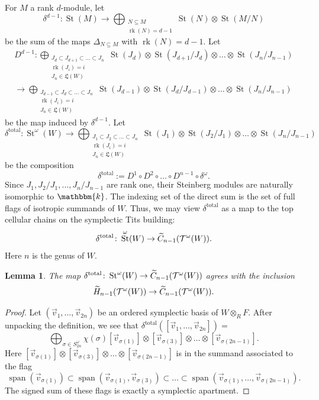 \documentclass[11pt,letterpaper]{amsart}
\newcommand{\bk}{\mathbbm{k}}
\DeclareMathOperator{\Span}{span}
\numberwithin{theoremcounter}{section}
\newtheorem{lemma}[lemmaauto]{Lemma}
\theoremstyle{definition}
\theoremstyle{remark}
\DeclareMathOperator{\rk}{rk}
\DeclareMathOperator{\St}{St}
\begin{document}
For $M$ a rank $d$-module, let $$\delta^{d-1} \colon \St(M) \longrightarrow \bigoplus_{\substack{N \subseteq M\\\rk(N)=d-1}} \St(N) \otimes \St(M/N) $$ be the sum of the maps $\Delta_{N \subseteq M}$ with $\rk(N)=d-1$. Let
\begin{multline*}D^{d-1} \colon \bigoplus_{\substack{J_d \subset J_{d+1} \subset \dots \subset J_n\\\rk(J_i) =i\\J_n \in \mathfrak L(W)}} \St(J_d) \otimes \St(J_{d+1}/J_d) \otimes \dots \otimes \St(J_n/J_{n-1}) \\
\longrightarrow\bigoplus_{\substack{J_{d-1} \subset J_d \subset \dots \subset J_n\\\rk(J_i) =i\\J_n \in \mathfrak L(W)}} \St(J_{d-1}) \otimes \St(J_d/J_{d-1}) \otimes \dots \otimes \St(J_n/J_{n-1}) 
\end{multline*}
be the map induced by $\delta^{d-1}$. Let 
$$\delta^{\mathrm{total}}\colon \St^\omega(W) \longrightarrow \bigoplus_{\substack{J_1 \subset J_2 \subset \dots \subset J_n\\\rk(J_i) =i\\J_n \in \mathfrak L(W)}} \St(J_1) \otimes \St(J_2/J_1) \otimes \dots \otimes \St(J_n/J_{n-1})$$ be the composition $$\delta^{\mathrm{total}}:=D^1 \circ D^2 \circ \dots\circ D^{n-1} \circ   \delta^\omega.$$ Since $J_1, J_2/J_1,\ldots,J_n/J_{n-1}$ are rank one, their Steinberg modules are naturally isomorphic to $\bk$. The indexing set of the direct sum is the set of full flags of isotropic summands of $W$. Thus,  we may view $\delta^{\mathrm{total}}$ as a map to the top cellular chains on the symplectic Tits building: $$\delta^{\mathrm{total}}\colon \St^\omega(W) \to \widetilde C_{n-1}(\cT^\omega(W)).$$ Here $n$ is the genus of $W$.

\begin{lemma}\label{lemma:deltatotal}
    The map $\delta^{\mathrm{total}}\colon \St^\omega(W) \to \widetilde C_{n-1}(\cT^\omega(W))$ agrees with the inclusion $$\widetilde H_{n-1}(\mathcal{T}^\omega(W)) \to \widetilde C_{n-1}(\mathcal{T}^\omega(W)).$$
\end{lemma}
\begin{proof}
Let $(\vec v_1,\ldots,\vec v_{2n})$ be an ordered  symplectic basis of $W \otimes_R F$. After unpacking the definition, we see that $\delta^{\mathrm{total}}([\vec v_1,\ldots,\vec v_{2n}])=$ $$\bigoplus_{\sigma \in S^\omega_{2n}} \chi(\sigma) [\vec v_{\sigma(1)}] \otimes [\vec v_{\sigma(3)}] \otimes \ldots \otimes [\vec v_{\sigma(2n-1)}]. $$  Here $[\vec v_{\sigma(1)}] \otimes [\vec v_{\sigma(3)}] \otimes \ldots \otimes [\vec v_{\sigma(2n-1)}]$ is in the summand associated to the flag $$\Span(\vec v_{\sigma(1)}) \subset \Span(\vec v_{\sigma(1)},\vec v_{\sigma(3)} ) \subset \ldots \subset \Span(\vec v_{\sigma(1)},\ldots,\vec v_{\sigma(2n-1)}). $$ The signed sum of these flags is exactly a symplectic apartment.
\end{proof}
\end{document}

